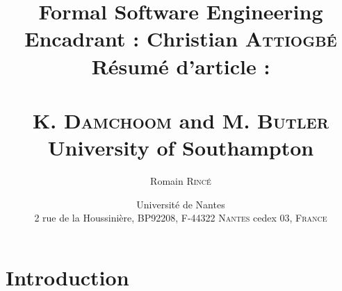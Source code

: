 \documentclass[12pt,a4paper,utf8x]{report}
\title{{\Huge Formal Software Engineering}\\{\small Encadrant : Christian \textsc{Attiogbé}}\\\vspace{3cm} Résumé d'article :\\\vspace{0.3cm}{\Large \emph{Applying Event and Machine Decomposition to a Flash-Based Filestore in Event-B}}\\\vspace{0.3cm}
\small K. \textsc{Damchoom} and M. \textsc{Butler}\\University of Southampton\\\vspace{2cm}}
\author{\vspace{2cm}Romain \textsc{Rincé}}
\date{\small Université de Nantes \\ 2 rue de la Houssinière, BP92208, F-44322 \textsc{Nantes} cedex 03, \textsc{France}}
\newcommand\fractal{\textsc{Fractal}}
\begin{document}
\maketitle
\renewcommand{\labelitemi}{$\bullet$} 


\section{Introduction}



% 
%
% 
% 
% 


\printindex

\appendix


\end{document}
